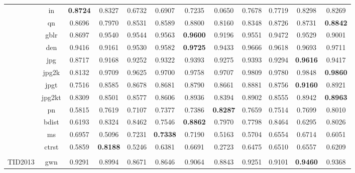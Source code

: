\documentclass[11pt,a4paper]{article}
\begin{document}
\begin{table}[!htb]
\begin{scriptsize}
\begin{threeparttable}
\begin{tabular}{*{12}{c}}
				& in & \textbf{0.8724} & 0.8327 & \cellcolor{green!25}0.6732 & \cellcolor{green!25}0.6907 & 0.7235 & \cellcolor{green!25}0.0650 & 0.7678 & 0.7719 & 0.8298 & 0.8269\\
				& qn & 0.8696 & \cellcolor{green!25}0.7970 & 0.8531 & 0.8589 & 0.8800 & 0.8160 & 0.8348 & 0.8726 & 0.8731 & \textbf{0.8842}\\
				& gblr & 0.8697 & \cellcolor{red!25}0.9540 & \cellcolor{red!25}0.9544 & \cellcolor{red!25}0.9563 & \cellcolor{red!25}\textbf{0.9600} & 0.9196 & \cellcolor{red!25}0.9551 & \cellcolor{red!25}0.9472 & \cellcolor{red!25}0.9529 & 0.9001\\
				& den & \cellcolor{green!25}0.9416 & \cellcolor{green!25}0.9161 & 0.9530 & 0.9582 & \textbf{0.9725} & \cellcolor{green!25}0.9433 & 0.9666 & 0.9618 & 0.9693 & 0.9711\\
				& jpg & \cellcolor{green!25}0.8717 & 0.9168 & 0.9252 & 0.9322 & 0.9393 & 0.9275 & 0.9393 & 0.9294 & \textbf{0.9616} & 0.9417\\
				& jpg2k & \cellcolor{green!25}0.8132 & \cellcolor{green!25}0.9709 & \cellcolor{green!25}0.9625 & \cellcolor{green!25}0.9700 & 0.9758 & \cellcolor{green!25}0.9707 & 0.9809 & 0.9780 & 0.9848 & \textbf{0.9860}\\
				& jpgt & \cellcolor{green!25}0.7516 & 0.8585 & 0.8678 & 0.8681 & 0.8790 & 0.8661 & 0.8881 & 0.8756 & \textbf{0.9160} & 0.8921\\
				& jpg2kt & 0.8309 & 0.8501 & 0.8577 & 0.8606 & 0.8936 & 0.8394 & 0.8902 & 0.8555 & 0.8942 & \textbf{0.8963}\\
				& pn & \cellcolor{green!25}0.5815 & 0.7619 & 0.7107 & 0.7377 & 0.7386 & \textbf{0.8287} & 0.7659 & 0.7514 & 0.7699 & 0.8010\\
				& bdist & \cellcolor{green!25}0.6193 & 0.8324 & 0.8462 & 0.7546 & \cellcolor{red!25}\textbf{0.8862} & 0.7970 & 0.7798 & 0.8464 & \cellcolor{green!25}0.6295 & 0.8026\\
				& ms & 0.6957 & 0.5096 & 0.7231 & \textbf{0.7338} & 0.7190 & 0.5163 & 0.5704 & 0.6554 & 0.6714 & 0.6051\\
				& ctrst & 0.5859 & \cellcolor{red!25}\textbf{0.8188} & 0.5246 & 0.6381 & 0.6691 & \cellcolor{green!25}0.2723 & 0.6475 & 0.6510 & 0.6557 & 0.6209\\
				\\
				\multirow{24}{*}{TID2013} & gwn & 0.9291 & 0.8994 & \cellcolor{green!25}0.8671 & \cellcolor{green!25}0.8646 & 0.9064 & \cellcolor{green!25}0.8843 & 0.9251 & 0.9101 & \textbf{0.9460} & 0.9368\\

\end{tabular}
\end{threeparttable}
\end{scriptsize}
\end{table}
\end{document}
